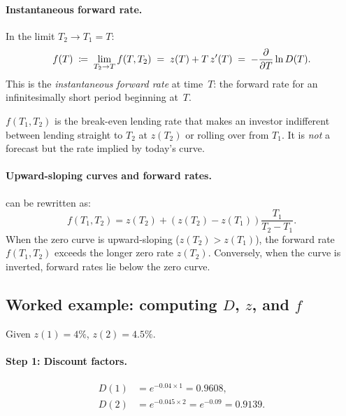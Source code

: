 \paragraph{Instantaneous forward rate.}
In the limit $T_2 \to T_1 = T$:
\begin{equation}
  f(T) \;\coloneqq\; \lim_{T_2 \to T} f(T, T_2)
  \;=\; z(T) + T\,z'(T)
  \;=\; -\frac{\partial}{\partial T}\ln D(T).
  \label{eq:instantaneous_forward}
\end{equation}
This is the \emph{instantaneous forward rate} at time~$T$: the
forward rate for an infinitesimally short period beginning at~$T$.

\begin{intuitionbox}
$f(T_1,T_2)$ is the break-even lending rate that makes an investor
indifferent between lending straight to $T_2$ at $z(T_2)$ or rolling
over from $T_1$.  It is \emph{not} a forecast but the rate
implied by today's curve.
\end{intuitionbox}

\paragraph{Upward-sloping curves and forward rates.}
 can be rewritten as:
\begin{equation}
  f(T_1,T_2) = z(T_2) + (z(T_2) - z(T_1))\frac{T_1}{T_2 - T_1}.
  \label{eq:forward_above_zero}
\end{equation}
When the zero curve is upward-sloping ($z(T_2) > z(T_1)$), the
forward rate $f(T_1,T_2)$ exceeds the longer zero rate $z(T_2)$.
Conversely, when the curve is inverted, forward rates lie below the
zero curve.

\subsection{Worked example: computing $D$, $z$, and $f$}
\label{sec:fi_worked_zero}

Given $z(1) = 4\%$, $z(2) = 4.5\%$.

\paragraph{Step 1: Discount factors.}
\begin{align}
  D(1) &= e^{-0.04 \times 1} = 0.9608, \label{eq:D1_example}\\
  D(2) &= e^{-0.045 \times 2} = e^{-0.09} = 0.9139.
    \label{eq:D2_example}
\end{align}

